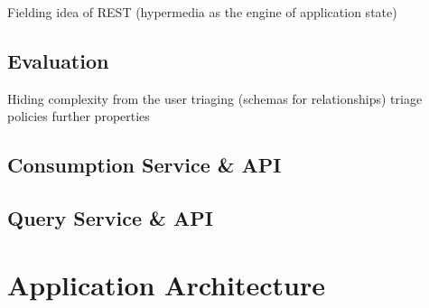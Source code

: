 Fielding idea of REST (hypermedia as the engine of application state)









\subsection{Evaluation}
Hiding complexity from the user
triaging (schemas for relationships)
triage policies
further properties
 


\subsection{Consumption Service \& API}

\subsection{Query Service \& API}

\section{Application Architecture}




